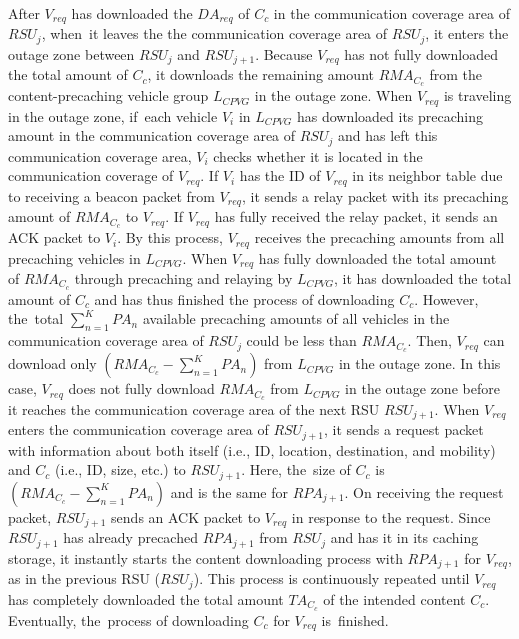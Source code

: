 \documentclass[sensors,aricle,accept,pdftex,moreauthors]{Definitions/mdpi}
\begin{document}
After $V_{req}$ has downloaded the $DA_{req}$ of $C_{c}$ in the communication coverage area of $RSU_{j}$, when~it leaves the the communication coverage area of $RSU_{j}$, it enters the outage zone between $RSU_{j}$ and $RSU_{j+1}$.
Because $V_{req}$ has not fully downloaded the total amount of $C_{c}$, it downloads the remaining amount $RMA_{C_{c}}$ from the content-precaching vehicle group $L_{CPVG}$ in the outage zone.
When $V_{req}$ is traveling in the outage zone, if~each vehicle $V_{i}$ in $L_{CPVG}$ has downloaded its precaching amount in the communication coverage area of $RSU_{j}$ and has left this communication coverage area, $V_{i}$ checks whether it is located in the communication coverage of $V_{req}$.
If $V_{i}$ has the ID of $V_{req}$ in its neighbor table due to receiving a beacon packet from $V_{req}$, it sends a relay packet with its precaching amount of $RMA_{C_{c}}$ to $V_{req}$. 
If $V_{req}$ has fully received the relay packet, it sends an ACK packet to $V_{i}$. 
By this process, $V_{req}$ receives the precaching amounts from all precaching vehicles in $L_{CPVG}$.  
When $V_{req}$ has fully downloaded the total amount of $RMA_{C_{c}}$ through precaching and relaying by $L_{CPVG}$, it has downloaded the total amount of $C_{c}$ and has thus finished the process of downloading $C_{c}$.
However, the~total $\sum^{K}_{n=1}PA_{n}$ available precaching amounts of all vehicles in the communication coverage area of $RSU_{j}$ could be less than $RMA_{C_{c}}$.
Then, $V_{req}$ can download only $(RMA_{C_{c}} - \sum^{K}_{n=1}PA_{n})$ from $L_{CPVG}$ in the outage zone.
In this case, $V_{req}$ does not fully download $RMA_{C_{c}}$ from $L_{CPVG}$ in the outage zone before it reaches the communication coverage area of the next RSU $RSU_{j+1}$.
When $V_{req}$ enters the communication coverage area of $RSU_{j+1}$, it sends a request packet with information about both itself (i.e., ID, location, destination, and mobility) and  $C_{c}$ (i.e., ID, size, etc.) to $RSU_{j+1}$.
Here, the~size of $C_{c}$ is $(RMA_{C_{c}} - \sum^{K}_{n=1}PA_{n})$ and is the same for $RPA_{j+1}$.
On receiving the request packet, $RSU_{j+1}$ sends an ACK packet to $V_{req}$ in response to the request. 
Since $RSU_{j+1}$ has already precached $RPA_{j+1}$ from $RSU_{j}$ and has it in its caching storage, it instantly starts the content downloading process with $RPA_{j+1}$ for $V_{req}$, as in the previous RSU ($RSU_{j}$). 
This process is continuously repeated until $V_{req}$ has completely downloaded the total amount $TA_{C_{c}}$ of the intended content $C_{c}$.
Eventually, the~process of downloading $C_{c}$ for $V_{req}$ is~finished.  
\end{document}

